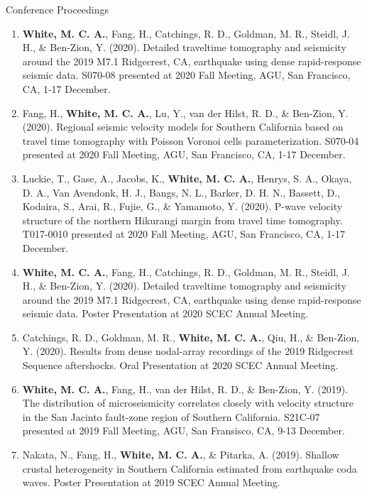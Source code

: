 \begin{rSection}{Conference Proceedings}
\begin{enumerate}
		\item \textbf{White, M. C. A.}, Fang, H., Catchings, R. D., Goldman, M. R., Steidl, J. H., \& Ben-Zion, Y. (2020). Detailed traveltime tomography and seismicity around the 2019 M7.1 Ridgecrest, CA, earthquake using dense rapid-response seismic data. S070-08 presented at 2020 Fall Meeting, AGU, San Francisco, CA, 1-17 December.

		\item Fang, H., \textbf{White, M. C. A.}, Lu, Y., van der Hilst, R. D., \& Ben-Zion, Y. (2020). Regional seismic velocity models for Southern California based on travel time tomography with Poisson Voronoi cells parameterization.  S070-04 presented at 2020 Fall Meeting, AGU, San Francisco, CA, 1-17 December.
		
		\item Luckie, T., Gase, A., Jacobs, K., \textbf{White, M. C. A.}, Henrys, S. A., Okaya, D. A., Van Avendonk, H. J., Bangs, N. L., Barker, D. H. N., Bassett, D., Kodaira, S., Arai, R., Fujie, G., \& Yamamoto, Y. (2020). P-wave velocity structure of the northern Hikurangi margin from travel time tomography. T017-0010 presented at 2020 Fall Meeting, AGU, San Francisco, CA, 1-17 December.

		\item \textbf{White, M. C. A.}, Fang, H., Catchings, R. D., Goldman, M. R., Steidl, J. H., \& Ben-Zion, Y. (2020). Detailed traveltime tomography and seismicity around the 2019 M7.1 Ridgecrest, CA, earthquake using dense rapid-response seismic data. Poster Presentation at 2020 SCEC Annual Meeting.

		\item Catchings, R. D., Goldman, M. R., \textbf{White, M. C. A.}, Qiu, H., \& Ben-Zion, Y. (2020). Results from dense nodal-array recordings of the 2019 Ridgecrest Sequence aftershocks. Oral Presentation at 2020 SCEC Annual Meeting.

		\item \textbf{White, M. C. A.}, Fang, H., van der Hilst, R. D., \& Ben-Zion, Y. (2019). The distribution of microseismicity correlates closely with velocity structure in the San Jacinto fault-zone region of Southern California. S21C-07 presented at 2019 Fall Meeting, AGU, San Fransisco, CA, 9-13 December.
		
		\item Nakata, N., Fang, H., \textbf{White, M. C. A.}, \& Pitarka, A. (2019). Shallow crustal heterogeneity in Southern California estimated from earthquake coda waves. Poster Presentation at 2019 SCEC Annual Meeting.
		

\end{enumerate}
\end{rSection}
